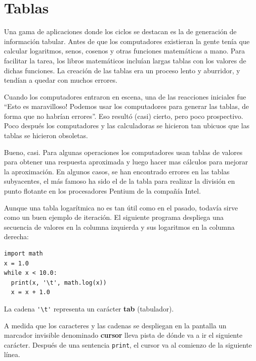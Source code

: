 \section{Tablas}

\label{tables}  

Una gama de aplicaciones donde los ciclos se destacan es la de generación
de información tabular. Antes de que los computadores existieran la
gente tenía que calcular logaritmos, senos, cosenos y otras funciones
matemáticas a mano. Para facilitar la tarea, los libros matemáticos
incluían largas tablas con los valores de dichas funciones. La creación
de las tablas era un proceso lento y aburridor, y tendían a quedar
con muchos errores.

Cuando los computadores entraron en escena, una de las reacciones
iniciales fue ``Esto es maravilloso! Podemos usar los computadores
para generar las tablas, de forma que no habrían errores''. Eso resultó
(casi) cierto, pero poco prospectivo. Poco después los computadores
y las calculadoras se hicieron tan ubicuos que las tablas se hicieron
obsoletas.

Bueno, casi. Para algunas operaciones los computadores usan tablas
de valores para obtener una respuesta aproximada y luego hacer mas
cálculos para mejorar la aproximación. En algunos casos, se han encontrado
errores en las tablas subyacentes, el más famoso ha sido el de la
tabla para realizar la división en punto flotante en los procesadores
Pentium de la compañía Intel.

 

Aunque una tabla logarítmica no es tan útil como en el pasado, todavía
sirve como un buen ejemplo de iteración. El siguiente programa despliega
una secuencia de valores en la columna izquierda y sus logaritmos
en la columna derecha: 
\begin{verbatim}
import math
x = 1.0
while x < 10.0:
  print(x, '\t', math.log(x))
  x = x + 1.0
\end{verbatim}

La cadena \verb+'\t'+ representa un carácter \textbf{tab} (tabulador).

A medida que los caracteres y las cadenas se despliegan en la pantalla
un marcador invisible denominado \textbf{cursor} lleva pista de dónde
va a ir el siguiente carácter. Después de una sentencia \texttt{print},
el cursor va al comienzo de la siguiente línea.

